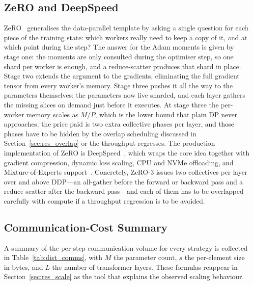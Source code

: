 \subsection{ZeRO and DeepSpeed}\label{sec:zero_bg}
ZeRO~\cite{rajbhandari2019zero,rajbhandari2021zero} generalises the
data-parallel template by asking a single question for each piece
of the training state: which workers really need to keep a copy of
it, and at which point during the step? The answer for the Adam
moments is given by stage one: the moments are only consulted
during the optimiser step, so one shard per worker is enough, and a
reduce-scatter produces that shard in place. Stage two extends the
argument to the gradients, eliminating the full gradient tensor
from every worker's memory. Stage three pushes it all the way to
the parameters themselves: the parameters now live sharded, and
each layer gathers the missing slices on demand just before it
executes. At stage three the per-worker memory scales as $M/P$,
which is the lower bound that plain DP never approaches; the price
paid is two extra collective phases per layer, and those phases
have to be hidden by the overlap scheduling discussed in
Section~\ref{sec:res_overlap} or the throughput regresses.
The production implementation of ZeRO is
DeepSpeed~\cite{rasley2020deepspeed}, which wraps the core idea
together with gradient compression, dynamic loss scaling, CPU and
NVMe offloading, and Mixture-of-Experts
support~\cite{rajbhandari2022deepspeed}. Concretely, ZeRO-3 issues
two collectives per layer over and above DDP---an all-gather before
the forward or backward pass and a reduce-scatter after the
backward pass---and each of them has to be overlapped carefully
with compute if a throughput regression is to be avoided.

\subsection{Communication-Cost Summary}\label{sec:dist_comms_summary}
A summary of the per-step communication volume for every strategy
is collected in Table~\ref{tab:dist_comms}, with $M$ the parameter
count, $s$ the per-element size in bytes, and $L$ the number of
transformer layers. These formulas reappear in
Section~\ref{sec:res_scale} as the tool that explains the observed
scaling behaviour.

